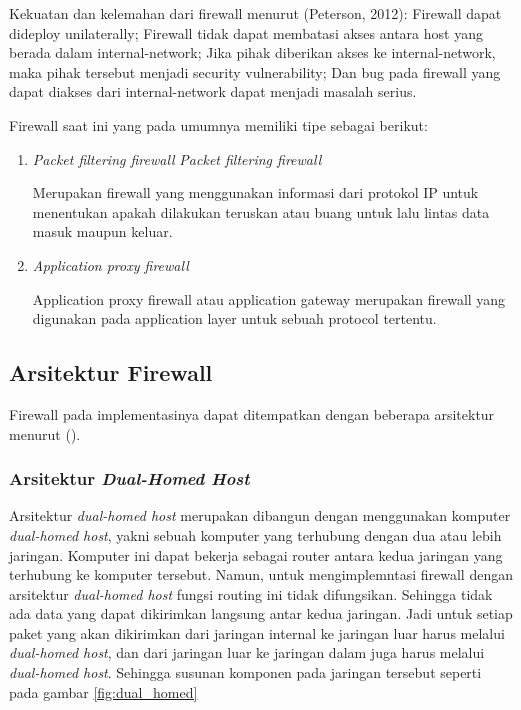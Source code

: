 Kekuatan dan kelemahan dari firewall menurut (Peterson, 2012):
Firewall dapat dideploy unilaterally;
Firewall tidak dapat membatasi akses antara host yang berada dalam internal-network;
Jika pihak diberikan akses ke internal-network, maka pihak tersebut menjadi security vulnerability;
Dan bug pada firewall yang dapat diakses dari internal-network dapat menjadi masalah serius.

Firewall saat ini yang pada umumnya memiliki tipe sebagai berikut:

\begin{enumerate}
	\item \textit{Packet filtering firewall}
	\textit{Packet filtering firewall}
	
	Merupakan firewall yang menggunakan informasi dari protokol IP untuk menentukan apakah dilakukan teruskan atau buang untuk lalu lintas data masuk maupun keluar.
	
	\item \textit{Application proxy firewall}
	
	Application proxy firewall atau application gateway merupakan firewall yang digunakan pada application layer untuk sebuah protocol tertentu.
\end{enumerate}

\subsection{Arsitektur Firewall}
Firewall pada implementasinya dapat ditempatkan dengan beberapa arsitektur menurut (\cite{zwicky2000building}).

\subsubsection{Arsitektur \textit{Dual-Homed Host}}

Arsitektur \textit{dual-homed host} merupakan dibangun dengan menggunakan komputer \textit{dual-homed host}, yakni sebuah komputer yang terhubung dengan dua atau lebih jaringan. Komputer ini dapat bekerja sebagai router antara kedua jaringan yang terhubung ke komputer tersebut. Namun, untuk mengimplemntasi firewall dengan arsitektur \textit{dual-homed host} fungsi routing ini tidak difungsikan. Sehingga tidak ada data yang dapat dikirimkan langsung antar kedua jaringan. Jadi untuk setiap paket yang akan dikirimkan dari jaringan internal ke jaringan luar harus melalui \textit{dual-homed host}, dan dari jaringan luar ke jaringan dalam juga harus melalui \textit{dual-homed host}. Sehingga susunan komponen pada jaringan tersebut seperti pada gambar \ref{fig:dual_homed}


